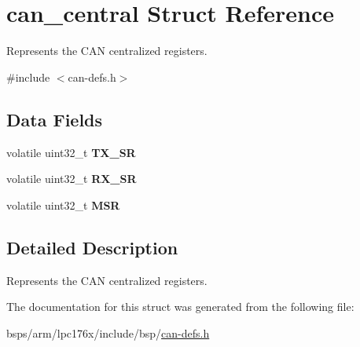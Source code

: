 \hypertarget{structcan__central}{}\section{can\+\_\+central Struct Reference}
\label{structcan__central}


Represents the C\+AN centralized registers.  




{\ttfamily \#include $<$can-\/defs.\+h$>$}

\subsection*{Data Fields}
\begin{DoxyCompactItemize}
\item 
\mbox{\label{structcan__central_abf05cc873136490a15dd14d276544b25}} 
volatile uint32\+\_\+t {\bfseries T\+X\+\_\+\+SR}
\item 
\mbox{\label{structcan__central_a0c25908c4b719ce55266c86fa66fe5c6}} 
volatile uint32\+\_\+t {\bfseries R\+X\+\_\+\+SR}
\item 
\mbox{\label{structcan__central_a6f965be262841ddb4169adfc99c2b32f}} 
volatile uint32\+\_\+t {\bfseries M\+SR}
\end{DoxyCompactItemize}


\subsection{Detailed Description}
Represents the C\+AN centralized registers. 

The documentation for this struct was generated from the following file\+:\begin{DoxyCompactItemize}
\item 
bsps/arm/lpc176x/include/bsp/\mbox{\hyperlink{can-defs_8h}{can-\/defs.\+h}}\end{DoxyCompactItemize}
